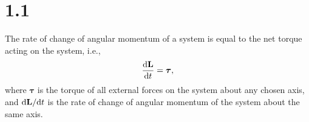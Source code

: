 \section{1.1}
\label{sec:1.1}


\begin{prin}
  \label{prin:angularMomentum}
  The rate of change of angular momentum of a system is equal to
  the net torque acting on the system,
  i.e.,
  \begin{equation}
    \frac{\mathrm{d} \mathbf{L}}{\mathrm{d} t} = \boldsymbol\tau,
  \end{equation}
  where $\boldsymbol\tau$ is the torque of all external forces on the system
  about any chosen axis,
  and $\mathrm{d} \mathbf{L}/\mathrm{d} t$ is the rate of change of
  angular momentum of the system about the same axis.
\end{prin}

